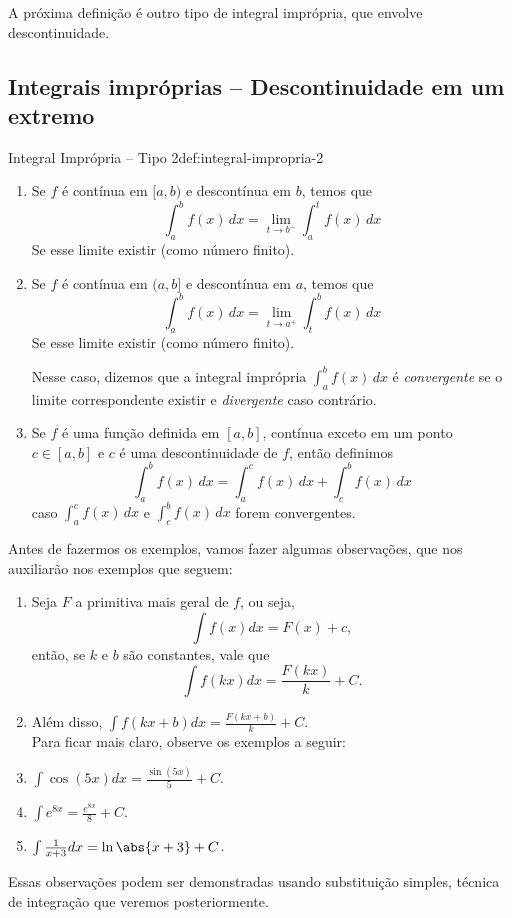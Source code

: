 A próxima definição é outro tipo de integral imprópria,
que envolve descontinuidade.

\subsection{Integrais impróprias -- Descontinuidade em um extremo}

\begin{definicao}{Integral Imprópria -- Tipo 2}{def:integral-impropria-2}
\begin{enumerate}

\item Se $f$ é contínua em $[a, b)$ e descontínua em $b$,
  temos que
  \[
    \int_a^b f(x)\,dx = \lim_{t\to b^{-}} \int_a^t f(x)\,dx
  \]
  Se esse limite existir (como número finito).

\item Se $f$ é contínua em $(a, b]$ e descontínua em $a$,
  temos que
  \[
    \int_a^b f(x)\,dx = \lim_{t\to a^{+}} \int_t^b f(x)\,dx
  \]
  Se esse limite existir (como número finito).

  Nesse caso, dizemos que a integral imprópria \(\int_a^b f(x)\,dx\) é
  \emph{convergente} se o limite correspondente existir e \emph{divergente}
  caso contrário.

\item  Se $f$ é uma função definida em $[a, b]$, contínua exceto em um ponto
  $c \in [a, b]$ e $c$ é uma descontinuidade de $f$, então definimos
  \[
    \int_a^b f(x) \, dx = \int_a^c f(x) \, dx + \int_c^b f(x) \, dx
  \]
  caso \(\int_a^c f(x)\,dx\) e \(\int_c^b f(x)\,dx\) forem convergentes.
  \end{enumerate}
\end{definicao}

Antes de fazermos os exemplos, vamos fazer algumas observações,
que nos auxiliarão nos exemplos que seguem:
\begin{enumerate}
  \item Seja $F$ a primitiva mais geral de $f$, ou seja,
  \[
    \int f(x)dx= F(x)+c,
  \]
    então, se $k$ e $b$ são constantes, vale que
  \[
    \int f(kx) dx= \frac{F(kx)}{k}+C.
  \]
  \item Além disso, \(\int f(kx+b)dx= \frac{F(kx+b)}{k}+C\). \\
  Para ficar mais claro, observe os exemplos a seguir:

  \item \(\int \cos(5x) dx= \frac{\sin(5x)}{5}+C\).

  \item \(\int e^{8x}= \frac{e^{8x}}{8}+C\).

  \item \(\int \frac{1}{x+3}dx= \ln\abs{x+3}+C\).

\end{enumerate}
Essas observações podem ser demonstradas usando substituição simples,
técnica de integração que veremos posteriormente.

